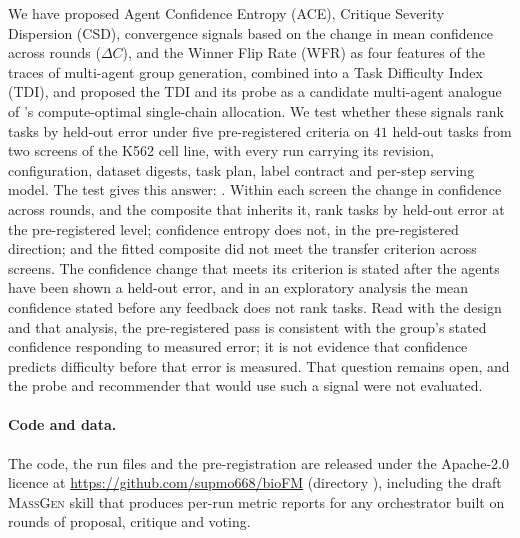 \documentclass[10pt,a4paper]{article}
\begin{document}
We have proposed Agent Confidence Entropy (ACE), Critique Severity Dispersion
(CSD), convergence signals based on the change in mean confidence across rounds
($\Delta C$), and the Winner Flip Rate (WFR) as four features of the traces of
multi-agent group generation, combined into a
Task Difficulty Index (TDI), and proposed the TDI and its probe as a candidate
multi-agent analogue of \citet{snell2024scaling}'s compute-optimal
single-chain allocation. We test whether these signals rank tasks by held-out
error under five pre-registered criteria on $41$ held-out tasks from two screens
of the K562 cell line, with
every run carrying its revision, configuration, dataset digests, task plan,
label contract and per-step serving model. The test gives this answer:
\resGateSummary. Within each screen the change in confidence across rounds, and the
composite that inherits it, rank tasks by held-out error at the pre-registered level;
confidence entropy does not, in the pre-registered direction; and the
fitted composite did not meet the transfer criterion across screens. The
confidence change that meets its criterion is stated after the agents have been
shown a held-out error, and in an exploratory analysis the mean confidence stated
before any feedback does not rank tasks. Read with the design and that analysis,
the pre-registered pass is consistent with the group's stated confidence
responding to measured error; it is not evidence that confidence predicts
difficulty before that error is measured. That question remains open, and the
probe and recommender that would use such a signal were not evaluated.

\paragraph{Code and data.} The code, the run files and the pre-registration are
released under the Apache-2.0 licence at \url{https://github.com/supmo668/bioFM}
(directory ), including the draft \textsc{MassGen}
skill that produces per-run metric reports for any orchestrator built on rounds of
proposal, critique and voting.

\small



\normalsize
\appendix

\end{document}
